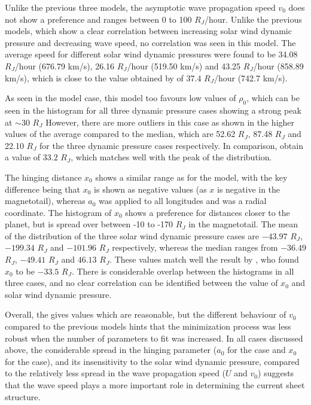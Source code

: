 Unlike the previous three models, the asymptotic wave propagation speed $v_0$ does not show a preference and ranges between 0 to 100 $R_J$/hour. Unlike the previous models, which show a clear correlation between increasing solar wind dynamic pressure and decreasing wave speed, no correlation was seen in this model. The average speed for different solar wind dynamic pressures were found to be 34.08 $R_J$/hour (676.79 km/s), 26.16 $R_J$/hour (519.50 km/s) and 43.25 $R_J$/hour (858.89 km/s), which is close to the value obtained by  of 37.4 $R_J$/hour (742.7 km/s). 

As seen in the  model case, this model too favours low values of $\rho_0$, which can be seen in the histogram for all three dynamic pressure cases showing a strong peak at $\sim30$ $R_J$ However, there are more outliers in this case as shown in the higher values of the average compared to the median, which are 52.62 $R_J$, 87.48 $R_J$ and 22.10 $R_J$ for the three dynamic pressure cases respectively. In comparison,  obtain a value of $33.2$ $R_J$, which matches well with the peak of the distribution. 

The hinging distance $x_0$ shows a similar range as for the  model, with the key difference being that $x_0$ is shown as negative values (as $x$ is negative in the magnetotail), whereas $a_0$ was applied to all longitudes and was a radial coordinate. The histogram of $x_0$ shows a preference for distances closer to the planet, but is spread over between -10 to -170 $R_J$ in the magnetotail. The mean of the distribution of the three solar wind dynamic pressure cases are $-43.97$ $R_J$, $-199.34$ $R_J$ and $-101.96$ $R_J$ respectively, whereas the median ranges from $-36.49$ $R_J$, $-49.41$ $R_J$ and $46.13$ $R_J$. These values match well the result by , who found $x_0$ to be $-33.5$ $R_J$. There is considerable overlap between the histograms in all three cases, and no clear correlation can be identified between the value of $x_0$ and solar wind dynamic pressure. 

Overall, the  gives values which are reasonable, but the different behaviour of $v_0$ compared to the previous models hints that the minimization process was less robust when the number of parameters to fit was increased. In all cases discussed above, the considerable spread in the hinging parameter ($a_0$ for the  case and $x_0$ for the  case), and its insensitivity to the solar wind dynamic pressure, compared to the relatively less spread in the wave propagation speed ($U$ and $v_0$) suggests that the wave speed plays a more important role in determining the current sheet structure. 

